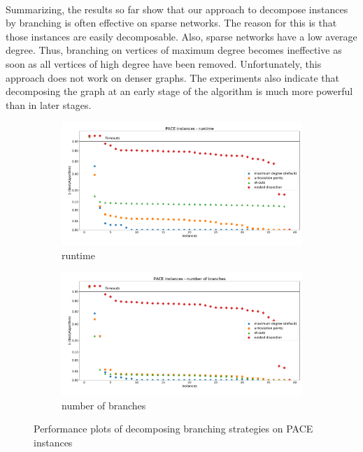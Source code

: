 \documentclass[12pt,a4paper,twoside]{scrartcl}
\numberwithin{equation}{section}
\begin{document}
\paragraph{}
Summarizing, the results so far show that our approach to decompose instances by branching is often effective on sparse networks. The reason for this is that those instances are easily decomposable. Also, sparse networks have a low average degree. Thus, branching on vertices of maximum degree becomes ineffective as soon as all vertices of high degree have been removed. Unfortunately, this approach does not work on denser graphs. The experiments also indicate that decomposing the graph at an early stage of the algorithm is much more powerful than in later stages.

\begin{figure}[hbt!]
	\begin{subfigure}{1\textwidth}
		\includegraphics[width=\textwidth]{images/plots/a1_pace_t}
		\caption{runtime}
	\end{subfigure}
	\begin{subfigure}{1\textwidth}
		\includegraphics[width=\textwidth]{images/plots/a1_pace_b}
		\caption{number of branches}
	\end{subfigure}
	\caption{Performance plots of decomposing branching strategies on PACE instances}
	\label{11}
\end{figure}
\end{document}
